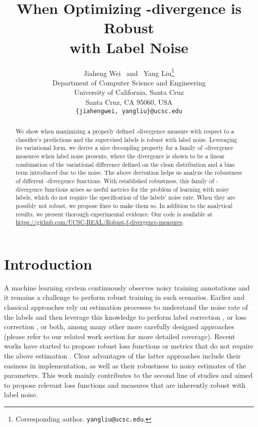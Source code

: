 \documentclass{article}
\title{When Optimizing  -divergence is Robust \\with Label Noise}
\author{Jiaheng Wei ~and~ Yang Liu\thanks{Corresponding author. \texttt{yangliu@ucsc.edu}.} \\
Department of Computer Science and Engineering\\
University of California, Santa Cruz\\
Santa Cruz, CA 95060, USA \\
\texttt{\{jiahengwei, yangliu\}@ucsc.edu} \\
}
\begin{document}
\iclrfinalcopy

\maketitle
\begin{abstract}
    We show when maximizing a properly defined -divergence measure with respect to a classifier's predictions and the supervised labels is robust with label noise. Leveraging its variational form, we derive a nice decoupling property for a family of -divergence measures when label noise presents, where the divergence is shown to be a linear combination of the variational difference defined on the clean distribution and a bias term introduced due to the noise. The above derivation helps us analyze the robustness of different -divergence functions. With established robustness, this family of -divergence functions arises as useful metrics for the problem of learning with noisy labels, which do not require the specification of the labels' noise rate. When they are possibly not robust, we propose fixes to make them so. In addition to the analytical results, we present thorough experimental evidence. Our code is available at \url{https://github.com/UCSC-REAL/Robust-f-divergence-measures}.
\end{abstract}



\section{Introduction}

A machine learning system continuously observes noisy training annotations and it remains a challenge to perform robust training in such scenarios. Earlier and classical approaches rely on estimation processes to understand the noise rate of the labels and then leverage this knowledge to perform label correction \citep{patrini2017making,lukasik2020does}, or loss correction \citep{natarajan2013learning,Ltl_2015_reweighting,patrini2017making}, or both, among many other more carefully designed approaches (please refer to our related work section for more detailed coverage). Recent works have started to propose robust loss functions or metrics that do not require the above estimation \citep{charoenphakdee2019symmetric,xu2019l_dmi,liu2019peer,cheng2020learning}. Clear advantages of the latter approaches include their easiness in implementation, as well as their robustness to noisy estimates of the parameters. This work mainly contributes to the second line of studies and aimed to propose relevant loss functions and measures that are inherently robust with label noise. 
\end{document}

